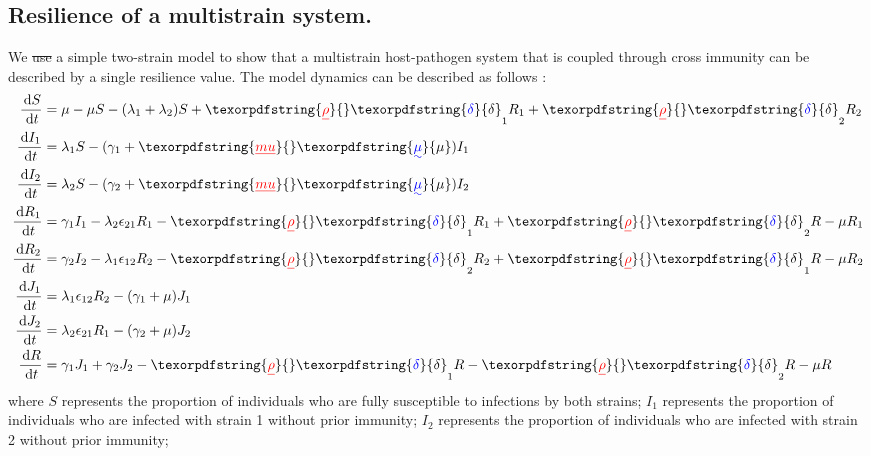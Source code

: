 \documentclass[12pt]{article}
\newcommand{\dd}[1]{\ensuremath{\, \mathrm{d}#1}}
\providecommand{\DIFaddtex}[1]{{\protect\color{blue}\uwave{#1}}} %
\providecommand{\DIFdeltex}[1]{{\protect\color{red}\sout{#1}}}                      %
\providecommand{\DIFaddbegin}{} %
\providecommand{\DIFaddend}{} %
\providecommand{\DIFdelbegin}{} %
\providecommand{\DIFdelend}{} %
\providecommand{\DIFadd}[1]{\texorpdfstring{\DIFaddtex{#1}}{#1}} %
\providecommand{\DIFdel}[1]{\texorpdfstring{\DIFdeltex{#1}}{}} %
\newcommand{\DIFscaledelfig}{0.5}
\newlength{\DIFdelgraphicswidth} %
\newlength{\DIFdelgraphicsheight} %
\newcommand{\DIFaddincludegraphics}[2][]{{\color{blue}\fbox{\DIFOincludegraphics[#1]{#2}}}} %
\newcommand{\DIFdelincludegraphics}[2][]{%
\sbox{\DIFdelgraphicsbox}{\DIFOincludegraphics[#1]{#2}}%
\settoboxwidth{\DIFdelgraphicswidth}{\DIFdelgraphicsbox} %
\settoboxtotalheight{\DIFdelgraphicsheight}{\DIFdelgraphicsbox} %
\scalebox{\DIFscaledelfig}{%
\parbox[b]{\DIFdelgraphicswidth}{\usebox{\DIFdelgraphicsbox}\\[-\baselineskip] \rule{\DIFdelgraphicswidth}{0em}}\llap{\resizebox{\DIFdelgraphicswidth}{\DIFdelgraphicsheight}{%
\setlength{\unitlength}{\DIFdelgraphicswidth}%
\begin{picture}(1,1)%
\thicklines\linethickness{2pt} %
{\color[rgb]{1,0,0}\put(0,0){\framebox(1,1){}}}%
{\color[rgb]{1,0,0}\put(0,0){\line( 1,1){1}}}%
{\color[rgb]{1,0,0}\put(0,1){\line(1,-1){1}}}%
\end{picture}%
}\hspace*{3pt}}} %
} %
\DeclareRobustCommand{\DIFaddbegin}{\DIFOaddbegin \let\includegraphics\DIFaddincludegraphics} %
\DeclareRobustCommand{\DIFaddend}{\DIFOaddend \let\includegraphics\DIFOincludegraphics} %
\DeclareRobustCommand{\DIFdelbegin}{\DIFOdelbegin \let\includegraphics\DIFdelincludegraphics} %
\DeclareRobustCommand{\DIFdelend}{\DIFOaddend \let\includegraphics\DIFOincludegraphics} %
\begin{document}
\subsection*{Resilience of a multistrain system.}

We \DIFdelbegin \DIFdel{use }\DIFdelend \DIFaddbegin \DIFadd{used }\DIFaddend a simple two-strain model to show that a multistrain host-pathogen system that is coupled through cross immunity can be described by a single resilience value.
The model dynamics can be described as follows \citep{bhattacharyya2015cross}: 
\begin{align}
\frac{\dd S}{\dd t} &= \mu - \mu S - (\lambda_1 + \lambda_2) S + \DIFdelbegin \DIFdel{\rho}\DIFdelend \DIFaddbegin \DIFadd{\delta}\DIFaddend _1 R_1 + \DIFdelbegin \DIFdel{\rho}\DIFdelend \DIFaddbegin \DIFadd{\delta}\DIFaddend _2 R_2 \\
\frac{\dd I_1}{\dd t} &= \lambda_1 S - (\gamma_1 + \DIFdelbegin \DIFdel{mu}\DIFdelend \DIFaddbegin \DIFadd{\mu}\DIFaddend ) I_1 \\
\frac{\dd I_2}{\dd t} &= \lambda_2 S - (\gamma_2 + \DIFdelbegin \DIFdel{mu}\DIFdelend \DIFaddbegin \DIFadd{\mu}\DIFaddend ) I_2 \\
\frac{\dd R_1}{\dd t} &= \gamma_1 I_1 - \lambda_2 \epsilon_{21} R_1 - \DIFdelbegin \DIFdel{\rho}\DIFdelend \DIFaddbegin \DIFadd{\delta}\DIFaddend _1 R_1 + \DIFdelbegin \DIFdel{\rho}\DIFdelend \DIFaddbegin \DIFadd{\delta}\DIFaddend _2 R - \mu R_1\\
\frac{\dd R_2}{\dd t} &= \gamma_2 I_2 - \lambda_1 \epsilon_{12} R_2 - \DIFdelbegin \DIFdel{\rho}\DIFdelend \DIFaddbegin \DIFadd{\delta}\DIFaddend _2 R_2 + \DIFdelbegin \DIFdel{\rho}\DIFdelend \DIFaddbegin \DIFadd{\delta}\DIFaddend _1 R - \mu R_2\\
\frac{\dd J_1}{\dd t} &= \lambda_1 \epsilon_{12} R_2 - (\gamma_1 + \mu) J_1\\
\frac{\dd J_2}{\dd t} &= \lambda_2 \epsilon_{21} R_1 - (\gamma_2 + \mu) J_2\\
\frac{\dd R}{\dd t} &= \gamma_1 J_1 + \gamma_2 J_2 - \DIFdelbegin \DIFdel{\rho}\DIFdelend \DIFaddbegin \DIFadd{\delta}\DIFaddend _1 R - \DIFdelbegin \DIFdel{\rho}\DIFdelend \DIFaddbegin \DIFadd{\delta}\DIFaddend _2 R - \mu R
\end{align}
where $S$ represents the proportion of individuals who are fully susceptible to infections by both strains;
$I_1$ represents the proportion of individuals who are infected with strain 1 without prior immunity;
$I_2$ represents the proportion of individuals who are infected with strain 2 without prior immunity;
\end{document}
